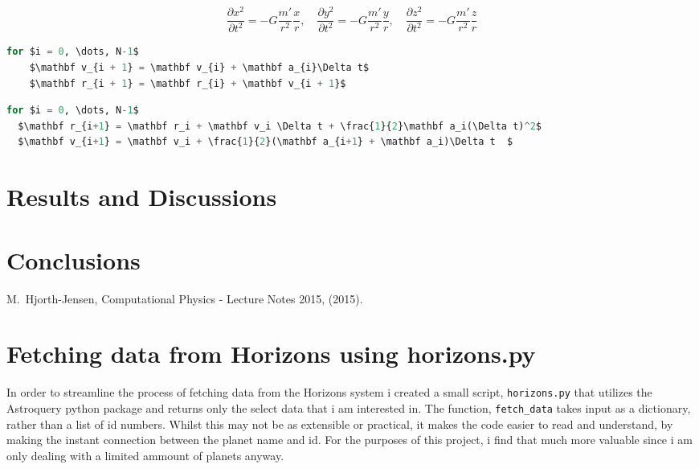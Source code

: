 \documentclass[10pt,showpacs,preprintnumbers,footinbib,amsmath,amssymb,aps,prl,twocolumn,groupedaddress,superscriptaddress,showkeys]{revtex4-1}
\begin{document}
    \begin{equation}
      \frac{\partial x^2}{\partial t^2} = -G\frac{m'}{r^2}\frac{x}{r}, \quad
      \frac{\partial y^2}{\partial t^2} = -G\frac{m'}{r^2}\frac{y}{r}, \quad
      \frac{\partial z^2}{\partial t^2} = -G\frac{m'}{r^2}\frac{z}{r}
    \end{equation}


\begin{lstlisting}[mathescape=true, language=python, title=Euler-Cromer Algorithm]
for $i = 0, \dots, N-1$
    $\mathbf v_{i + 1} = \mathbf v_{i} + \mathbf a_{i}\Delta t$
    $\mathbf r_{i + 1} = \mathbf r_{i} + \mathbf v_{i + 1}$
\end{lstlisting}

\begin{lstlisting}[mathescape=true, language=python, title=Velocity-Verlet Algorithm]
for $i = 0, \dots, N-1$
  $\mathbf r_{i+1} = \mathbf r_i + \mathbf v_i \Delta t + \frac{1}{2}\mathbf a_i(\Delta t)^2$
  $\mathbf v_{i+1} = \mathbf v_i + \frac{1}{2}(\mathbf a_{i+1} + \mathbf a_i)\Delta t  $
\end{lstlisting}

\section{Results and Discussions}

\section{Conclusions}


\begin{thebibliography}{99}
 M.~Hjorth-Jensen, Computational Physics - Lecture Notes 2015, (2015).
\end{thebibliography}

\appendix
\section{Fetching data from Horizons using horizons.py}
  In order to streamline the process of fetching data from the Horizons system i created a small script, \lstinline{horizons.py} that utilizes the Astroquery python package and returns only the select data that i am interested in. The function, \lstinline{fetch_data} takes input as a dictionary, rather than a list of id numbers. Whilst this may not be as extensible or practical, it makes the code easier to read and understand, by making the instant connection between the planet name and id. For the purposes of this project, i find that much more valuable since i am only dealing with a limited ammount of planets anyway.
\end{document}
